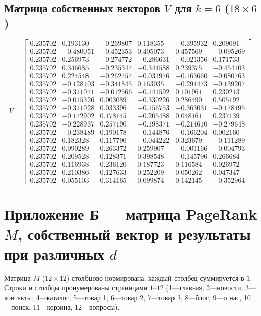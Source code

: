 \documentclass[12pt,a4paper]{article}
\begin{document}
\subsection{Матрица собственных векторов $V$ для $k=6$ ($18\times6$)}
\begingroup\footnotesize\setlength{\arraycolsep}{4pt}
\[
V=
\left[\begin{array}{rrrrrr}
0.235702& 0.193130&-0.269807& 0.118355&-0.395932& 0.209091\\
0.235702&-0.480051&-0.452353& 0.405073& 0.457569&-0.095269\\
0.235702& 0.256973&-0.274772&-0.286631&-0.021356& 0.171733\\
0.235702& 0.346685&-0.235347&-0.344588& 0.239375&-0.454103\\
0.235702& 0.224548&-0.262757&-0.031976&-0.163660&-0.080763\\
0.235702&-0.128103&-0.341845& 0.163035&-0.294473&-0.139207\\
0.235702&-0.311071&-0.012566&-0.141592& 0.101961& 0.230213\\
0.235702&-0.015326& 0.003089&-0.330226& 0.286490& 0.505192\\
0.235702&-0.311028& 0.033396&-0.156753&-0.363031&-0.178495\\
0.235702&-0.172902& 0.178145&-0.205488& 0.048161& 0.237139\\
0.235702&-0.228937& 0.257190&-0.198371&-0.214610&-0.279648\\
0.235702&-0.238489& 0.190178&-0.144876&-0.166204& 0.002160\\
0.235702& 0.182328& 0.117790&-0.044222& 0.323679&-0.111289\\
0.235702& 0.090289& 0.263372& 0.259907&-0.001166&-0.004793\\
0.235702& 0.209528& 0.128371& 0.398548&-0.145796& 0.266684\\
0.235702& 0.116938& 0.236120& 0.187723& 0.116584& 0.026972\\
0.235702& 0.210386& 0.127633& 0.252209& 0.050262& 0.047347\\
0.235702& 0.055103& 0.314165& 0.099874& 0.142145&-0.352964
\end{array}\right]
\]
\endgroup

\section{Приложение Б --- матрица PageRank $M$, собственный вектор и результаты при различных $d$}

Матрица $M$ ($12\times12$) столбцово-нормирована: каждый столбец суммируется в $1$. Строки и столбцы пронумерованы страницами $1$--$12$ (1---главная, 2---новости, 3---контакты, 4---каталог, 5---товар 1, 6---товар 2, 7---товар 3, 8---блог, 9---о нас, 10---поиск, 11---корзина, 12---вопросы).
\end{document}
